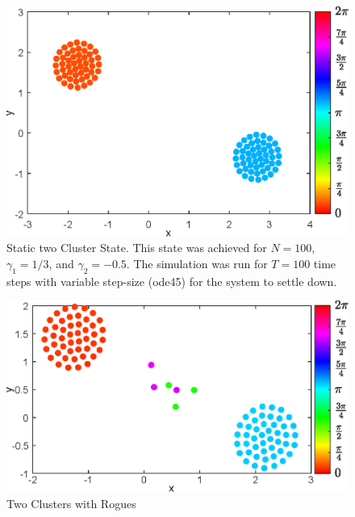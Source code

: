 \documentclass[twocolumn,10pt]{asme2ej}
\begin{document}
{\begin{figure}[h!]
        \includegraphics[width = \linewidth]{TwoCluster.eps}
        \caption{Static two Cluster State. This state was achieved for \(N = 100\), \(\gamma_1 = 1/3\), and \(\gamma_2 = -0.5\). The simulation was run for \(T = 100\) time steps with variable step-size (ode45) for the system to settle down.}
        \vspace{-12mm}
        \label{fig:static2}
    \end{figure}
    \begin{figure}[h!]
        \includegraphics[width = \linewidth]{twoClustersWithR100.eps}
        \caption{Two Clusters with Rogues}
    \end{figure}
    \begin{figure}[h!]

\end{figure}}
\end{document}
